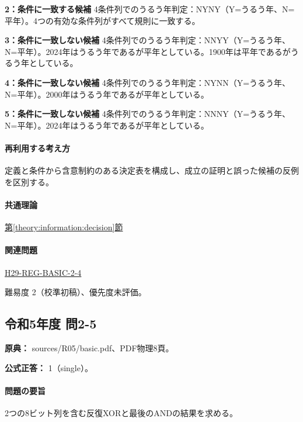 \noindent\textbf{2：条件に一致する候補} 4条件列でのうるう年判定：NYNY（Y=うるう年、N=平年）。4つの有効な条件列がすべて規則に一致する。\par

\noindent\textbf{3：条件に一致しない候補} 4条件列でのうるう年判定：NNYY（Y=うるう年、N=平年）。2024年はうるう年であるが平年としている。1900年は平年であるがうるう年としている。\par

\noindent\textbf{4：条件に一致しない候補} 4条件列でのうるう年判定：NYNN（Y=うるう年、N=平年）。2000年はうるう年であるが平年としている。\par

\noindent\textbf{5：条件に一致しない候補} 4条件列でのうるう年判定：NNNY（Y=うるう年、N=平年）。2024年はうるう年であるが平年としている。\par

\paragraph{再利用する考え方} 定義と条件から含意制約のある決定表を構成し、成立の証明と誤った候補の反例を区別する。

\paragraph{共通理論} \hyperref[theory:information:decision]{第\ref*{theory:information:decision}節}

\paragraph{関連問題} \hyperref[q:h29-reg-basic-2-4]{H29-REG-BASIC-2-4}

\par 難易度 2（校準初稿）、優先度未評価。

\subsection{令和5年度 問2-5}
\label{q:r05-reg-basic-2-5}

\noindent\textbf{原典：} sources/R05/basic.pdf、PDF物理8頁。

\textbf{公式正答：} 1（single）。

\paragraph{問題の要旨} 2つの8ビット列を含む反復XORと最後のANDの結果を求める。

